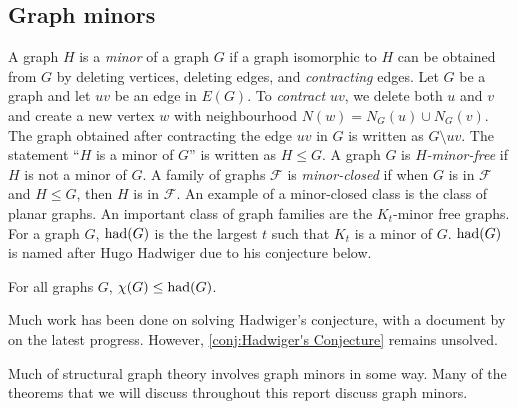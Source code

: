 \subsection{Graph minors}\label{sec:Graph Minors}
A graph \(H\) is a \textit{minor} of a graph \(G\) if a graph isomorphic to \(H\) can be obtained from \(G\) by deleting vertices, deleting edges, and \textit{contracting} edges. Let $G$ be a graph and let $uv$ be an edge in $E(G)$. To \textit{contract} \(uv\), we delete both \(u\) and \(v\) and create a new vertex \(w\) with neighbourhood \(N(w) = N_G(u) \cup N_G(v)\). The graph obtained after contracting the edge \(uv\) in $G$ is written as \(G\setminus uv\).
The statement ``\(H\) is a minor of \(G\)'' is written as \(H \leq G\). A graph \(G\) is \textit{\(H\)-minor-free} if $H$ is not a minor of $G$. A family of graphs \(\mathcal{F}\) is \textit{minor-closed} if when $G$ is in \(\mathcal{F}\) and \(H \leq G\), then $H$ is in \(\mathcal{F}\).
An example of a minor-closed class is the class of planar graphs.
An important class of graph families are the \(K_t\)-minor free graphs. For a graph \(G\), \(\operatorname{had}(G)\) is the the largest \(t\) such that \(K_t\) is a minor of \(G\). $\operatorname{had}(G)$ is named after Hugo Hadwiger due to his conjecture below.

\begin{conjecture}\label{conj:Hadwiger's Conjecture}
	For all graphs \(G\), \(\chi(G) \leq \operatorname{had}(G)\)\cite{hadwigerUeberKlassifikationStreckenkomplexe1943}.
\end{conjecture}
Much work has been done on solving Hadwiger's conjecture, with a document by \textcite{seymourHadwigerConjecture2016} on the latest progress. However, \cref{conj:Hadwiger's Conjecture} remains unsolved. 

 Much of structural graph theory involves graph minors in some way. Many of the theorems that we will discuss throughout this report discuss graph minors. 

